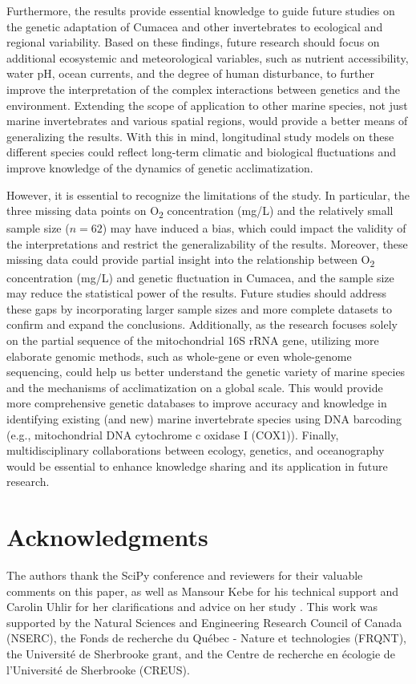 Furthermore, the results provide essential knowledge to guide future studies on the genetic adaptation of Cumacea and other invertebrates to ecological and regional variability. Based on these findings, future research should focus on additional ecosystemic and meteorological variables, such as nutrient accessibility, water pH, ocean currents, and the degree of human disturbance, to further improve the interpretation of the complex interactions between genetics and the environment. Extending the scope of application to other marine species, not just marine invertebrates and various spatial regions, would provide a better means of generalizing the results. With this in mind, longitudinal study models on these different species could reflect long-term climatic and biological fluctuations and improve knowledge of the dynamics of genetic acclimatization.

However, it is essential to recognize the limitations of the study. In particular, the three missing data points on O\textsubscript{2} concentration (mg/L) and the relatively small sample size ($n=62$) may have induced a bias, which could impact the validity of the interpretations and restrict the generalizability of the results. Moreover, these missing data could provide partial insight into the relationship between O\textsubscript{2} concentration (mg/L) and genetic fluctuation in Cumacea, and the sample size may reduce the statistical power of the results. Future studies should address these gaps by incorporating larger sample sizes and more complete datasets to confirm and expand the conclusions. Additionally, as the research focuses solely on the partial sequence of the mitochondrial 16S rRNA gene, utilizing more elaborate genomic methods, such as whole-gene or even whole-genome sequencing, could help us better understand the genetic variety of marine species and the mechanisms of acclimatization on a global scale. This would provide more comprehensive genetic databases to improve accuracy and knowledge in identifying existing (and new) marine invertebrate species using DNA barcoding (e.g., mitochondrial DNA cytochrome c oxidase I (COX1)). Finally, multidisciplinary collaborations between ecology, genetics, and oceanography would be essential to enhance knowledge sharing and its application in future research.

\section{Acknowledgments}\label{acknowledgments}
The authors thank the SciPy conference and reviewers for their valuable comments on this paper, as well as Mansour Kebe for his technical support and Carolin Uhlir for her clarifications and advice on her study \citep{uhlir_adding_2021}. This work was supported by the Natural Sciences and Engineering Research Council of Canada (NSERC), the Fonds de recherche du Québec - Nature et technologies (FRQNT), the Université de Sherbrooke grant, and the Centre de recherche en écologie de l’Université de Sherbrooke (CREUS).
